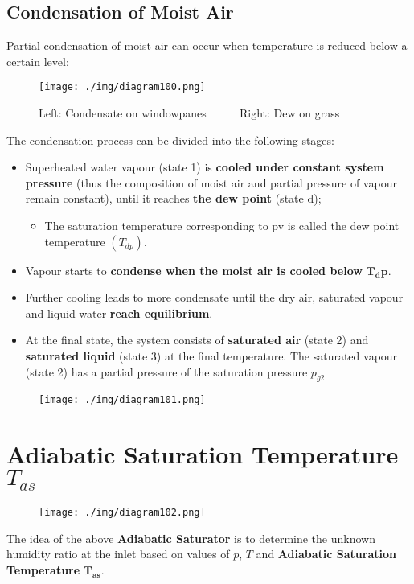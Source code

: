 \subsection{Condensation of Moist Air}
Partial condensation of moist air can occur when temperature is reduced below a certain level:
\begin{figure}[H]
  \centering
  \texttt{[image: ./img/diagram100.png]}
  \caption{Left: Condensate on windowpanes \ \ | \ \ Right: Dew on grass}
\end{figure}
The condensation process can be divided into the following stages:
\begin{itemize}[noitemsep]
  \item Superheated water vapour (state 1) is \textbf{cooled under constant system pressure} (thus the composition of moist air and partial pressure of vapour remain constant), until it reaches \textbf{the dew point} (state d);
        \begin{itemize}[noitemsep]
          \item The saturation temperature corresponding to pv is called the dew point temperature $(T_{dp})$.
        \end{itemize}
  \item Vapour starts to \textbf{condense when the moist air is cooled below} $\mathbf{T_dp}$.
  \item Further cooling leads to more condensate until the dry air, saturated vapour and liquid water \textbf{reach equilibrium}.
  \item At the final state, the system consists of \textbf{saturated air} (state 2) and \textbf{saturated liquid} (state 3) at the final temperature. The saturated vapour (state 2) has a partial pressure of the saturation pressure $p_{g2}$
\end{itemize}
\begin{figure}[H]
  \centering
  \texttt{[image: ./img/diagram101.png]}
  \caption{}
\end{figure}
\section{Adiabatic Saturation Temperature $T_{as}$}
\begin{figure}[H]
  \centering
  \texttt{[image: ./img/diagram102.png]}
  \caption{}
\end{figure}
The idea of the above \textbf{Adiabatic Saturator} is to determine the unknown humidity ratio at the inlet based on values of $p$, $T$ and \textbf{Adiabatic Saturation Temperature} $\mathbf{T_{as}}$.
